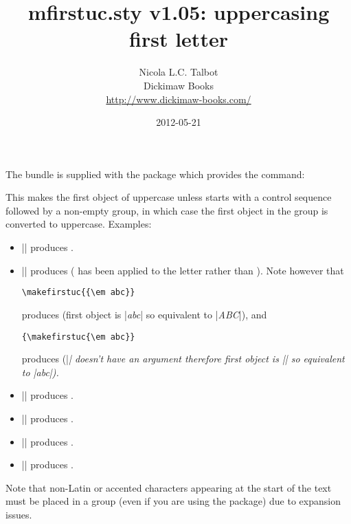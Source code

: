 \documentclass{nlctdoc}
\begin{document}
 \title{mfirstuc.sty v1.05: uppercasing first letter}
 \author{Nicola L.C. Talbot\\[10pt]
Dickimaw Books\\
\url{http://www.dickimaw-books.com/}}

 \date{2012-05-21}
 \maketitle

The  bundle is supplied with the package 
 which provides the command:
\begin{definition}[\DescribeMacro{\makefirstuc}]
\end{definition}
This makes the first object of
 uppercase unless  starts with a control
sequence followed by a non-empty group, in which case the first
object in the group is converted to uppercase. Examples:
\begin{itemize}
\item || produces .

\item || produces 
( has been applied to the letter  rather
than ). Note however that
\begin{verbatim}
\makefirstuc{{\em abc}}
\end{verbatim}
produces  (first object is |{\em abc}| so
equivalent to |\MakeUppercase{\em abc}|), and
\begin{verbatim}
{\makefirstuc{\em abc}}
\end{verbatim}
produces {} (|\em| doesn't have an argument
therefore first object is |\em| so equivalent to
|{\MakeUppercase{\em}abc}|).

\item || produces .

\item || produces .

\item || produces .

\item || produces .

\end{itemize}
Note that non-Latin or accented characters appearing at the
start of the text must be placed in a group (even if you are
using the  package) due to expansion issues.
\end{document}
